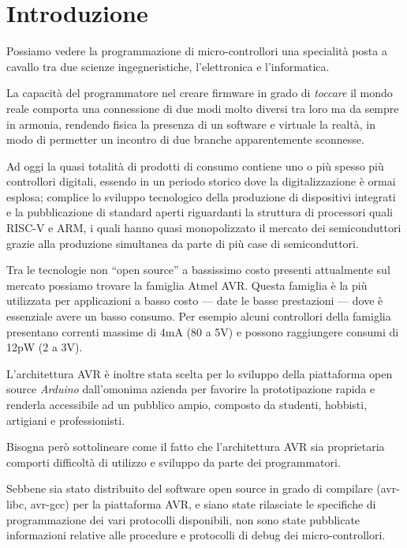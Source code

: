\chapter{Introduzione}

Possiamo vedere la programmazione di micro-controllori una specialità posta a cavallo tra due scienze ingegneristiche, l'elettronica e l'informatica.

La capacità del programmatore nel creare firmware in grado di \textit{toccare} il mondo reale comporta una connessione di due modi molto diversi tra loro ma da sempre in armonia, rendendo fisica la presenza di un software e virtuale la realtà, in modo di permetter un incontro di due branche apparentemente sconnesse.

Ad oggi la quasi totalità di prodotti di consumo contiene uno o più spesso più controllori digitali, essendo in un periodo storico dove la digitalizzazione è ormai esplosa; complice lo sviluppo tecnologico della produzione di dispositivi integrati e la pubblicazione di standard aperti riguardanti la struttura di processori quali RISC-V e ARM\cite{site:arm-licensing}, i quali hanno quasi monopolizzato il mercato dei semiconduttori grazie alla produzione simultanea da parte di più case di semiconduttori.

Tra le tecnologie non ``open source'' a bassissimo costo presenti attualmente sul mercato possiamo trovare la famiglia Atmel AVR. Questa famiglia è la più utilizzata per applicazioni a basso costo --- date le basse prestazioni --- dove è essenziale avere un basso consumo. Per esempio alcuni controllori della famiglia presentano correnti massime di 4mA (80 a 5V) e possono raggiungere consumi di 12pW (2 a 3V)\cite{avr:tiny4}.

L'architettura AVR è inoltre stata scelta per lo sviluppo della piattaforma open source \textit{Arduino} dall'omonima azienda per favorire la prototipazione rapida e renderla accessibile ad un pubblico ampio, composto da studenti, hobbisti, artigiani e professionisti\cite{site:arduino-about}.

Bisogna però sottolineare come il fatto che l'architettura AVR sia proprietaria comporti difficoltà di utilizzo e sviluppo da parte dei programmatori.

Sebbene sia stato distribuito del software open source in grado di compilare (avr-libc\cite{site:avr-libc}, avr-gcc\cite{site:avr-gcc}) per la piattaforma AVR, e siano state rilasciate le specifiche di programmazione dei vari protocolli disponibili\cite{avr:appnote:isp}\cite{avr:appnote:tpi}\cite{todo:jtag}, non sono state pubblicate informazioni relative alle procedure e protocolli di debug dei micro-controllori.
